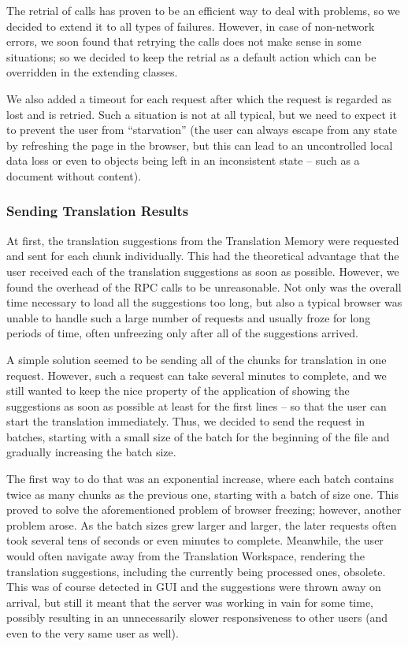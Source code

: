 {The retrial of calls has proven to be an efficient way to deal with problems, so we decided to extend it to all types of failures. However, in case of non-network errors, we soon found that retrying the calls does not make sense in some situations; so we decided to keep the retrial as a default action which can be overridden in the extending classes.

We also added a timeout for each request after which the request is regarded as lost and is retried. Such a situation is not at all typical, but we need to expect  it to prevent the user from ``starvation'' (the user can always escape from any state by refreshing the page in the browser, but this can lead to an uncontrolled local data loss or even to objects being left in an inconsistent state -- such as a document without content).

\subsubsection{Sending Translation Results}

At first, the translation suggestions from the Translation Memory were requested and sent for each chunk individually. This had the theoretical advantage that the user received each of the translation suggestions as soon as possible. However, we found the overhead of the RPC calls to be unreasonable. Not only was the overall time necessary to load all the suggestions too long, but also a typical browser was unable to handle such a large number of requests and usually froze for long periods of time, often unfreezing only after all of the suggestions arrived.

A simple solution seemed to be sending all of the chunks for translation in one request. However, such a request can take several minutes to complete, and we still wanted to keep the nice property of the application of showing the suggestions as soon as possible at least for the first lines -- so that the user can start the translation immediately. Thus, we decided to send the request in batches, starting with a small size of the batch for the beginning of the file and gradually increasing the batch size.

The first way to do that was an exponential increase, where each batch contains twice as many chunks as the previous one, starting with a batch of size one. This proved to solve the aforementioned problem of browser freezing; however, another problem arose. As the batch sizes grew larger and larger, the later requests often took several tens of seconds or even minutes to complete. Meanwhile, the user would often navigate away from the Translation Workspace, rendering the translation suggestions, including the currently being processed ones, obsolete. This was of course detected in GUI and the suggestions were thrown away on arrival, but still it meant that the server was working in vain for some time, possibly resulting in an unnecessarily slower responsiveness to other users (and even to the very same user as well).

}
